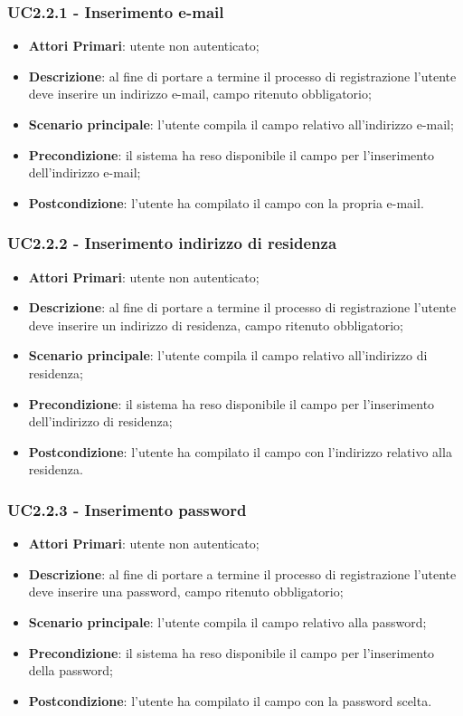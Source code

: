 \subsubsection{UC2.2.1 - Inserimento e-mail}
\begin{itemize}
	\item \textbf{Attori Primari}: utente non autenticato;
	\item \textbf{Descrizione}: al fine di portare a termine il processo di registrazione l'utente deve inserire un indirizzo e-mail, campo ritenuto obbligatorio;
	\item \textbf{Scenario principale}: l'utente compila il campo relativo all'indirizzo e-mail;
	\item \textbf{Precondizione}: il sistema ha reso disponibile il campo per l'inserimento dell'indirizzo e-mail;
	\item \textbf{Postcondizione}: l'utente ha compilato il campo con la propria e-mail.
	
\end{itemize}
\subsubsection{UC2.2.2 - Inserimento indirizzo di residenza}
\begin{itemize}
	\item \textbf{Attori Primari}: utente non autenticato;
	\item \textbf{Descrizione}: al fine di portare a termine il processo di registrazione l'utente deve inserire un indirizzo di residenza, campo ritenuto obbligatorio;
	\item \textbf{Scenario principale}: l'utente compila il campo relativo all'indirizzo di residenza;
	\item \textbf{Precondizione}: il sistema ha reso disponibile il campo per l'inserimento dell'indirizzo di residenza;
	\item \textbf{Postcondizione}: l'utente ha compilato il campo con l'indirizzo relativo alla residenza.
\end{itemize}
\subsubsection{UC2.2.3 - Inserimento password}
\begin{itemize}
	\item \textbf{Attori Primari}: utente non autenticato;
	\item \textbf{Descrizione}: al fine di portare a termine il processo di registrazione l'utente deve inserire una password, campo ritenuto obbligatorio;
	\item \textbf{Scenario principale}: l'utente compila il campo relativo alla password;
	\item \textbf{Precondizione}: il sistema ha reso disponibile il campo per l'inserimento della password;
	\item \textbf{Postcondizione}: l'utente ha compilato il campo con la password scelta.
\end{itemize}
